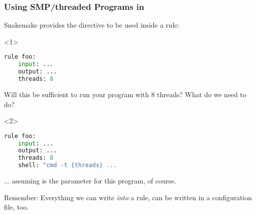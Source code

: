 \begin{frame}[fragile]
\begin{center}
	\end{center}
\end{frame}


\begin{frame}[fragile]
	\frametitle{Using SMP/threaded Programs in \Snakemake}
	Snakemake provides the  directive to be used inside a rule:
	\begin{onlyenv}
	\begin{lstlisting}[language=Python,style=Python]
rule foo:
    input: ...
    output: ...
    threads: 8
	\end{lstlisting}
    \begin{question}
    	Will this be sufficient to run your program with 8 threads? What do we need to do?
    \end{question}
    \end{onlyenv}
    \begin{onlyenv}<2>
    \begin{lstlisting}[language=Python,style=Python]
rule foo:
    input: ...
    output: ...
    threads: 8
    shell: "cmd -t {threads} ...
    \end{lstlisting}
    ... assuming  is the parameter for this program, of course.
    \begin{hint}
    	Remember: Everything we can write \emph{into} a rule, can be written in a configuration file, too.
    \end{hint}
    \end{onlyenv}
\end{frame}

